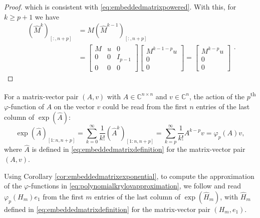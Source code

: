 \begin{proof}
    which is consistent with \eqref{eq:embeddedmatrixpowered}.
    With this, for $k \ge p+1$ we have
    \begin{equation*}
        \begin{aligned}
            (\hat{M}^k)_{[:, n+p]} & = \hat{M} (\hat{M}^{k-1})_{[:, n+p]} \\
            & =
            \begin{bmatrix} M & u & 0\\ 0 & 0 & I_{p-1}\\ 0 & 0 & 0 \end{bmatrix}
            \begin{bmatrix} M^{k-1-p} u \\ 0 \\ 0 \end{bmatrix}
            =
            \begin{bmatrix} M^{k-p} u \\ 0 \\ 0 \end{bmatrix}
        \end{aligned}.
    \end{equation*}
\end{proof}

\begin{corollary}
    \label{cor:embeddedmatrixexponential}
    For a matrix-vector pair $(A, v)$ with $A \in \mathbb{C}^{n \times n}$ and
    $v \in \mathbb{C}^n$, the action of the $p$\textsuperscript{th} $\varphi$-function
    of $A$ on the vector $v$ could be read from the first $n$ entries of the last
    column of $\exp(\hat{A})$:
    \begin{equation*}
        \exp(\hat{A})_{[1 : n, n+p]}
        = \sum_{k=0}^{\infty}{\frac{1}{k!} (\hat{A}^k)_{[1 : n, n+p]}}
        = \sum_{k=p}^{\infty}{\frac{1}{k!} A^{k-p} v} = \varphi_p(A) v,
    \end{equation*}
    where $\hat{A}$ is defined in \eqref{eq:embeddedmatrixdefinition} for the matrix-vector
    pair $(A, v)$.
\end{corollary}

Using Corollary \ref{cor:embeddedmatrixexponential}, to compute the approximation
of the $\varphi$-functions in \eqref{eq:polynomialkrylovapproximation},
we follow \cite{niesen2012} and read $\varphi_p(H_m) e_1$ from the first $m$ entries
of the last column of $\exp(\hat{H}_m)$, with $\hat{H}_m$ defined in
\eqref{eq:embeddedmatrixdefinition} for the matrix-vector pair $(H_m, e_1)$.


